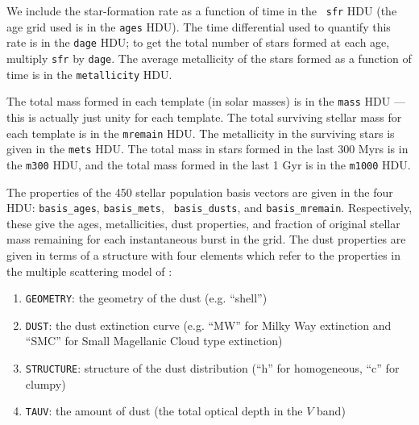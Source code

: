 \documentclass[12pt,preprint]{aastex}
\begin{document}
We include the star-formation rate as a function of time in the {\tt
sfr} HDU (the age grid used is in the {\tt ages} HDU). The time
differential used to quantify this rate is in the {\tt dage} HDU; to
get the total number of stars formed at each age, multiply {\tt sfr}
by {\tt dage}. The average metallicity of the stars formed as a
function of time is in the {\tt metallicity} HDU.

The total mass formed in each template (in solar masses) is in the
{\tt mass} HDU --- this is actually just unity for each template. The
total surviving stellar mass for each template is in the {\tt mremain}
HDU. The metallicity in the surviving stars is given in the {\tt mets}
HDU.  The total mass in stars formed in the last 300 Myrs is in the
{\tt m300} HDU, and the total mass formed in the last 1 Gyr is in the
{\tt m1000} HDU.

The properties of the 450 stellar population basis vectors are given
in the four HDU: {\tt basis\_ages}, {\tt basis\_mets}, {\tt
basis\_dusts}, and {\tt basis\_mremain}. Respectively, these give the
ages, metallicities, dust properties, and fraction of original stellar
mass remaining for each instantaneous burst in the grid. The dust 
properties are given in terms of a structure with four elements which
refer to the properties in the multiple scattering model of \citet{witt00a}:
\begin{enumerate}
\item {\tt GEOMETRY}: the geometry of the dust (e.g. ``shell'') 
\item {\tt DUST}: the dust extinction curve (e.g. ``MW'' for Milky
	Way extinction and ``SMC'' for Small Magellanic Cloud type
	extinction) 
\item {\tt STRUCTURE}: structure of the dust distribution (``h'' for
	homogeneous, ``c'' for clumpy)
\item {\tt TAUV}: the amount of dust (the total optical depth in the
	$V$ band)
\end{enumerate}

\newpage
\end{document}
